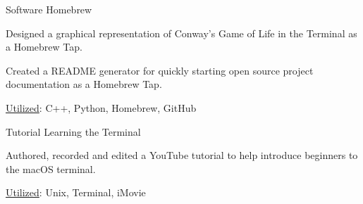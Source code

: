 

\begin{cventries}

  \cventry
    {Software} %
    {Homebrew} %
    {} %
    {} %
    {
      \begin{cvitems} %
        \item {Designed a graphical representation of Conway's Game of Life in the Terminal as a Homebrew Tap.}
        \item {Created a README generator for quickly starting open source project documentation as a Homebrew Tap.}
        \item {\underline{Utilized}: C++, Python, Homebrew, GitHub}
      \end{cvitems}
    }
    
  \cventry
    {Tutorial} %
    {Learning the Terminal} %
    {} %
    {} %
    {
      \begin{cvitems} %
        \item {Authored, recorded and edited a YouTube tutorial to help introduce beginners to the macOS terminal.}
        \item {\underline{Utilized}: Unix, Terminal, iMovie}
      \end{cvitems}
    }


\end{cventries}
